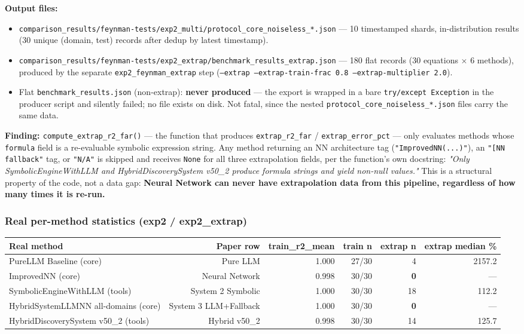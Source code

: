 \documentclass[11pt]{article}
\newcommand{\finding}[1]{\par\noindent\textbf{\textcolor{red!60!black}{Finding: }}#1\par}
\newcommand{\code}[1]{\texttt{#1}}
\begin{document}
\textbf{Output files:}
\begin{itemize}
  \item \code{comparison\_results/feynman-tests/exp2\_multi/protocol\_core\_noiseless\_*.json}
        --- 10 timestamped shards, in-distribution results (30 unique
        (domain, test) records after dedup by latest timestamp).
  \item \code{comparison\_results/feynman-tests/exp2\_extrap/benchmark\_results\_extrap.json}
        --- 180 flat records (30 equations $\times$ 6 methods), produced by
        the separate \code{exp2\_feynman\_extrap} step (\code{--extrap
        --extrap-train-frac 0.8 --extrap-multiplier 2.0}).
  \item Flat \code{benchmark\_results.json} (non-extrap): \textbf{never
        produced} --- the export is wrapped in a bare
        \code{try/except Exception} in the producer script and silently
        failed; no file exists on disk. Not fatal, since the nested
        \code{protocol\_core\_noiseless\_*.json} files carry the same data.
\end{itemize}

\finding{\code{compute\_extrap\_r2\_far()} --- the function that produces
\code{extrap\_r2\_far} / \code{extrap\_error\_pct} --- only evaluates methods
whose \code{formula} field is a re-evaluable symbolic expression string. Any
method returning an NN architecture tag (\code{"ImprovedNN(...)"}), an
\code{"[NN fallback"} tag, or \code{"N/A"} is skipped and receives
\code{None} for all three extrapolation fields, per the function's own
docstring: \emph{"Only SymbolicEngineWithLLM and HybridDiscoverySystem v50\_2
produce formula strings and yield non-null values."} This is a structural
property of the code, not a data gap: \textbf{Neural Network can never have
extrapolation data from this pipeline, regardless of how many times it is
re-run.}}

\subsubsection*{Real per-method statistics (exp2 / exp2\_extrap)}

\begin{center}
\begin{tabular}{lrrrrr}
\toprule
\textbf{Real method} & \textbf{Paper row} & \textbf{train\_r2\_mean} & \textbf{train n} & \textbf{extrap n} & \textbf{extrap median \%} \\
\midrule
PureLLM Baseline (core)              & Pure LLM               & 1.000 & 27/30 & 4  & 2157.2 \\
ImprovedNN (core)                    & Neural Network          & 0.998 & 30/30 & \textbf{0}  & --- \\
SymbolicEngineWithLLM (tools)        & System 2 Symbolic       & 1.000 & 30/30 & 18 & 112.2 \\
HybridSystemLLMNN all-domains (core) & System 3 LLM+Fallback   & 1.000 & 30/30 & \textbf{0}  & --- \\
HybridDiscoverySystem v50\_2 (tools) & Hybrid v50\_2           & 0.998 & 30/30 & 14 & 125.7 \\
\bottomrule
\end{tabular}
\end{center}
\end{document}
